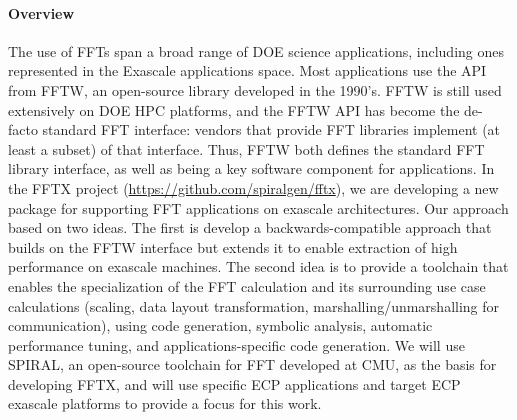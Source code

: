 \paragraph{Overview}
The use of FFTs span a broad range of DOE science applications, including ones represented in the Exascale applications space. Most applications use the API from FFTW, an open-source library developed in the 1990's. FFTW is still used extensively on DOE HPC platforms, and the FFTW API has become the de-facto
standard FFT interface: vendors that provide FFT libraries implement
(at least a subset) of that interface. Thus, FFTW both defines the 
standard FFT library interface, as well as being a key software component
for applications.
In the FFTX project (\url{https://github.com/spiralgen/fftx}), 
we are developing a new package for supporting FFT applications on exascale architectures. Our approach based on two ideas. The first is develop a backwards-compatible approach that builds on the FFTW interface but extends it to enable extraction of high performance on exascale machines. The second idea is to provide a toolchain that enables the
specialization of the FFT calculation and its surrounding use case calculations (scaling, data layout transformation, marshalling/unmarshalling for communication), using code generation, symbolic analysis, automatic performance tuning, and applications-specific code generation. We will use SPIRAL, an open-source toolchain for FFT developed at CMU, as the basis for developing FFTX, and will use specific ECP applications and target ECP exascale platforms to provide a focus for this work.

